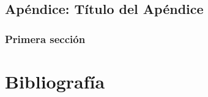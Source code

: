 \documentclass[12pt,a4paper,oneside,]{article}
\def\ifdoblecara{} %
\let\ifdoblecara\undefined %
\def\ifcitapandoc{} %
\let\ifcitapandoc\undefined %
\numberwithin{dummy}{section}
\theoremstyle{ocrenumbox}
\theoremstyle{blacknumex}
\theoremstyle{blacknumbox}
\theoremstyle{ocrenum}
\theoremstyle{ocrenum}
\begin{document}
\nocite{Luque2017,Luque2019,RStudio,R-base2,
R-knitr,R-rmarkdown,R-dplyr,R-ggplot2,Techopedia}

\fi

\ifdefined\ifdoblecara
\fancyhead{}{}
\fancyhead[LE,RO]{\scriptsize\rightmark}
\fancyfoot[LO,RE]{\scriptsize\slshape \leftmark}
\fancyfoot[C]{}
\fancyfoot[LE,RO]{\footnotesize\thepage}
\else
\fancyhead{}{}
\fancyhead[RO]{\scriptsize\rightmark}
\fancyfoot[LO]{\scriptsize\slshape \leftmark}
\fancyfoot[C]{}
\fancyfoot[RO]{\footnotesize\thepage}
\fi

\renewcommand{\headrulewidth}{0.4pt}
\renewcommand{\footrulewidth}{0.4pt}

\hypertarget{apuxe9ndice-tuxedtulo-del-apuxe9ndice-1}{%
\section{Apéndice: Título del
Apéndice}\label{apuxe9ndice-tuxedtulo-del-apuxe9ndice-1}}

\hypertarget{primera-secciuxf3n-5}{%
\subsection{Primera sección}\label{primera-secciuxf3n-5}}

\FloatBarrier
\cleardoublepage

\ifdefined\ifdoblecara
  \fancyhead[LE,RO]{}
  \fancyfoot[LO,RE]{}
\else
  \fancyhead[RO]{}
  \fancyfoot[LO]{}
\fi

\ifdefined\ifcitapandoc

\hypertarget{bibliografuxeda}{%
\chapter*{Bibliografía}\label{bibliografuxeda}}

\else

\nocite{Luque2017,Luque2019,RStudio,R-base2,
R-knitr,R-rmarkdown,R-dplyr,R-ggplot2,Techopedia,
webfacmatematicasus1,webUS2a,webPedroLuque,
lopez2007aplicacion}

\fi




\end{document}
